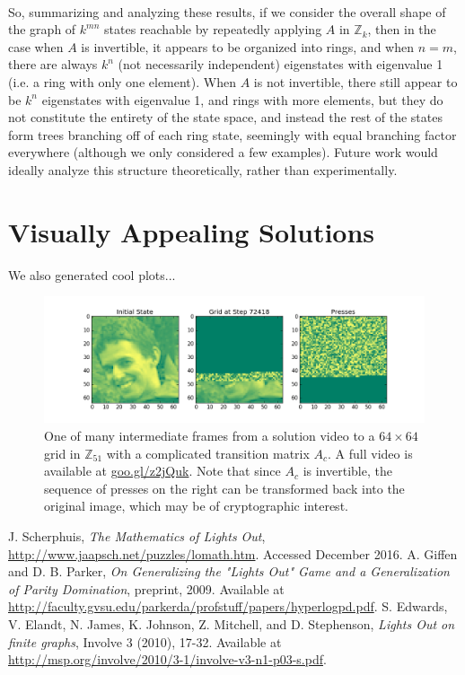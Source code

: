 \documentclass[11pt]{article}
\newcommand{\modZ}[1]{$\mathbb{Z}_{#1}$}
\begin{document}
\paragraph{} So, summarizing and analyzing these results, if we consider the overall shape of the graph of $k^{mn}$ states reachable by repeatedly applying $A$ in \modZ{k}, then in the case when $A$ is invertible, it appears to be organized into rings, and when $n=m$, there are always $k^n$ (not necessarily independent) eigenstates with eigenvalue 1 (i.e. a ring with only one element). When $A$ is not invertible, there still appear to be $k^n$ eigenstates with eigenvalue 1, and rings with more elements, but they do not constitute the entirety of the state space, and instead the rest of the states form trees branching off of each ring state, seemingly with equal branching factor everywhere (although we only considered a few examples). Future work would ideally analyze this structure theoretically, rather than experimentally.

\section*{Visually Appealing Solutions}

We also generated cool plots...

\begin{figure}[H]
  \caption{One of many intermediate frames from a solution video to a $64 \times 64$ grid in \modZ{51} with a complicated transition matrix $A_c$. A full video is available at \href{https://goo.gl/z2jQuk}{goo.gl/z2jQuk}. Note that since $A_c$ is invertible, the sequence of presses on the right can be transformed back into the original image, which may be of cryptographic interest.}
  \label{chr-solution}
  \includegraphics[width=\textwidth]{img000072418.png}
\end{figure}

\clearpage

\begin{thebibliography}{9}
  J. Scherphuis, \textit{The Mathematics of Lights Out},
  \href{http://www.jaapsch.net/puzzles/lomath.htm}{http://www.jaapsch.net/puzzles/lomath.htm}.
  Accessed December 2016.
  A. Giffen and D. B. Parker, \textit{On Generalizing the "Lights Out" Game and a Generalization of Parity Domination}, preprint, 2009. Available at \href{http://faculty.gvsu.edu/parkerda/profstuff/papers/hyperlogpd.pdf}{http://faculty.gvsu.edu/parkerda/profstuff/papers/hyperlogpd.pdf}.
  S. Edwards, V. Elandt, N. James, K. Johnson, Z. Mitchell, and D. Stephenson, \textit{Lights Out on finite graphs}, Involve 3 (2010), 17-32. Available at \href{http://msp.org/involve/2010/3-1/involve-v3-n1-p03-s.pdf}{http://msp.org/involve/2010/3-1/involve-v3-n1-p03-s.pdf}.
\end{thebibliography}
\end{document}
